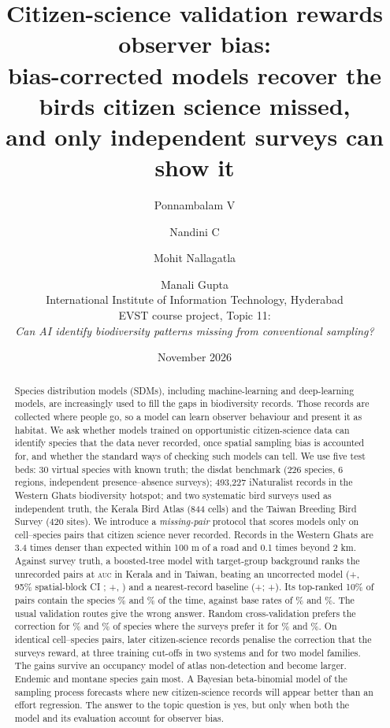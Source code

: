 \documentclass[11pt]{article}
\title{\Large\textbf{Citizen-science validation rewards observer bias:\\ bias-corrected models recover the birds citizen science missed,\\ and only independent surveys can show it}}
\author{Ponnambalam V \and Nandini C \and Mohit Nallagatla \and Manali Gupta\\[4pt]
\small International Institute of Information Technology, Hyderabad\\
\small EVST course project, Topic 11:\\ \small\emph{Can AI identify biodiversity patterns missing from conventional sampling?}}
\date{November 2026}
\newcommand{\auc}{\textsc{auc}}
\begin{document}
\maketitle

\begin{abstract}
\noindent Species distribution models (SDMs), including machine-learning and deep-learning models, are increasingly used to fill the gaps in biodiversity records. Those records are collected where people go, so a model can learn observer behaviour and present it as habitat. We ask whether models trained on opportunistic citizen-science data can identify species that the data never recorded, once spatial sampling bias is accounted for, and whether the standard ways of checking such models can tell. We use five test beds: 30 virtual species with known truth; the disdat benchmark (226 species, 6 regions, independent presence--absence surveys); 493,227 iNaturalist records in the Western Ghats biodiversity hotspot; and two systematic bird surveys used as independent truth, the Kerala Bird Atlas (844 cells) and the Taiwan Breeding Bird Survey (420 sites). We introduce a \emph{missing-pair} protocol that scores models only on cell--species pairs that citizen science never recorded. Records in the Western Ghats are 3.4 times denser than expected within 100 m of a road and 0.1 times beyond 2 km. Against survey truth, a boosted-tree model with target-group background ranks the unrecorded pairs at \auc{} \KaucTGB{} in Kerala and \TaucTGB{} in Taiwan, beating an uncorrected model (+\KgainTGB{}, 95\% spatial-block CI \KgainCI; +\TgainTGB{}, \TgainCI) and a nearest-record baseline (+\KgainNear{}; +\TgainNear{}). Its top-ranked 10\% of pairs contain the species \KhitTGB\% and \ThitTGB\% of the time, against base rates of \Kbase\% and \Tbase\%. The usual validation routes give the wrong answer. Random cross-validation prefers the correction for \KcvPick\% and \TcvPick\% of species where the surveys prefer it for \KtrPick\% and \TtrPick\%. On identical cell--species pairs, later citizen-science records penalise the correction that the surveys reward, at three training cut-offs in two systems and for two model families. The gains survive an occupancy model of atlas non-detection and become larger. Endemic and montane species gain most. A Bayesian beta-binomial model of the sampling process forecasts where new citizen-science records will appear better than an effort regression. The answer to the topic question is yes, but only when both the model and its evaluation account for observer bias.
\end{abstract}
\end{document}
